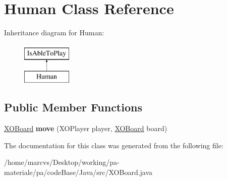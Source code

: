 \hypertarget{classHuman}{
\section{Human Class Reference}
\label{classHuman}
}
Inheritance diagram for Human:\begin{figure}[H]
\begin{center}
\leavevmode
\includegraphics[height=2.000000cm]{classHuman}
\end{center}
\end{figure}
\subsection*{Public Member Functions}
\begin{DoxyCompactItemize}
\item 
\hypertarget{classHuman_a23e90c0545d898da0d16f716d1cdbeb1}{
\hyperlink{classXOBoard}{XOBoard} {\bfseries move} (XOPlayer player, \hyperlink{classXOBoard}{XOBoard} board)}
\label{classHuman_a23e90c0545d898da0d16f716d1cdbeb1}

\end{DoxyCompactItemize}


The documentation for this class was generated from the following file:\begin{DoxyCompactItemize}
\item 
/home/marcvs/Desktop/working/pa-\/materiale/pa/codeBase/Java/src/XOBoard.java\end{DoxyCompactItemize}
